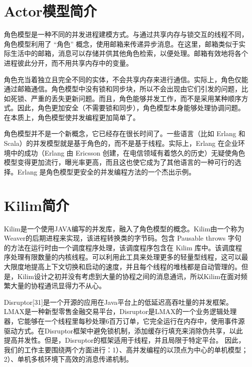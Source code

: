 \section{Actor模型简介}

角色模型是一种不同的并发进程建模方式。与通过共享内存与锁交互的线程不同，角色模型利用了 “角色” 概念，使用邮箱来传递异步消息。在这里，邮箱类似于实际生活中的邮箱，消息可以存储并供其他角色检索，以便处理。邮箱有效地将各个进程彼此分开，而不用共享内存中的变量。

角色充当着独立且完全不同的实体，不会共享内存来进行通信。实际上，角色仅能通过邮箱通信。角色模型中没有锁和同步块，所以不会出现由它们引发的问题，比如死锁、严重的丢失更新问题。而且，角色能够并发工作，而不是采用某种顺序方式。因此，角色更加安全（不需要锁和同步），角色模型本身能够处理协调问题。在本质上，角色模型使并发编程更加简单了。

角色模型并不是一个新概念，它已经存在很长时间了。一些语言（比如 Erlang 和 Scala）的并发模型就是基于角色的，而不是基于线程。实际上，Erlang 在企业环境中的成功（Erlang 由 Ericsson 创建，在电信领域有着悠久的历史）无疑使角色模型变得更加流行，曝光率更高，而且这也使它成为了其他语言的一种可行的选择。Erlang 是角色模型更安全的并发编程方法的一个杰出示例。


\section{Kilim简介}

Kilim是一个使用JAVA编写的并发库，融入了角色模型的概念。Kilim由一个称为Weaver的后期进程来实现，该进程转换类的字节码。包含 Pausable throws 字句的方法在运行时由一个调度程序处理，该调度程序包含在 Kilim 库中。该调度程序处理有限数量的内核线程。可以利用此工具来处理更多的轻量型线程，这可以最大限度地提高上下文切换和启动的速度，并且每个线程的堆栈都是自动管理的。但是，Kilim设计之初并没有考虑到大量的协程之间的消息通讯，所以Kilim在面对频繁大量的协程通讯显得力不从心。

Disruptor[31]是一个开源的应用在Java平台上的低延迟高吞吐量的并发框架。LMAX是一种新型零售金融交易平台，Disruptor是LMAX的一个业务逻辑处理器，它能够在一个线程里每秒处理6百万订单，它完全运行在内存中，使用事件源驱动方式。在Disruptor框架中避免锁机制，添加缓存行填充来消除伪共享，以此提高并发性。但是，Disruptor的框架适用于线程，并且局限于特定平台。
因此，我们的工作主要围绕两个方面进行：1）、高并发编程的以顶点为中心的单机模型；2）、单机多核环境下高效的消息传递机制。
